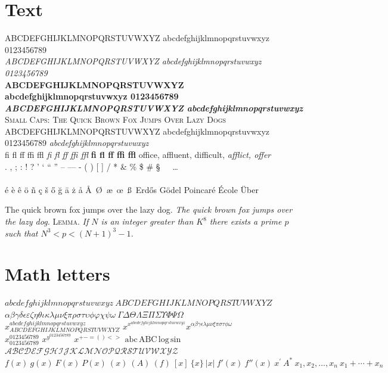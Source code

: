 \section*{Text}
\noindent ABCDEFGHIJKLMNOPQRSTUVWXYZ abcdefghijklmnopqrstuvwxyz 0123456789\\
\textit{ABCDEFGHIJKLMNOPQRSTUVWXYZ abcdefghijklmnopqrstuvwxyz 0123456789}\\
\textbf{ABCDEFGHIJKLMNOPQRSTUVWXYZ abcdefghijklmnopqrstuvwxyz 0123456789}\\
\textbf{\textit{ABCDEFGHIJKLMNOPQRSTUVWXYZ abcdefghijklmnopqrstuvwxyz}}\\
\textsc{Small Caps: The Quick Brown Fox Jumps Over Lazy Dogs}\\
{\small ABCDEFGHIJKLMNOPQRSTUVWXYZ abcdefghijklmnopqrstuvwxyz 0123456789 \textit{abcdefghijklmnopqrstuvwxyz}}\\
fi fl ff ffi ffl \textit{fi fl ff ffi ffl} \textbf{fi fl ff ffi ffl} office, affluent, difficult, \textit{afflict, offer}\\
. , ; : ! ? ' ` `` '' -- --- - ( ) [ ] / * \& \% \$ \# \S\ \dag\ \ddag\ \dots\\
 {\small{}}\\
\'e \`e \^e \"o \~n \c{c} \v{s} \H{o} \u{g} \=a \.z \r{a} \AA\ \O\ \ae\ \oe\ \ss\ Erd\H{o}s G\"odel Poincar\'e \'Ecole \"Uber

The quick brown fox jumps over the lazy dog. \textit{The quick brown fox jumps over the lazy dog.}
\textsc{Lemma.} \textit{If $N$ is an integer greater than $K^8$ there exists a prime $p$ such that $N^3<p<(N+1)^3-1$.}

\section*{Math letters}
$abcdefghijklmnopqrstuvwxyz\ ABCDEFGHIJKLMNOPQRSTUVWXYZ$\\
$\alpha\beta\gamma\delta\epsilon\varepsilon\zeta\eta\theta\iota\kappa\lambda\mu\nu\xi\pi\rho\sigma\tau\upsilon\phi\varphi\chi\psi\omega\ \Gamma\Delta\Theta\Lambda\Xi\Pi\Sigma\Upsilon\Phi\Psi\Omega$\\
$x^{abcdefghijklmnopqrstuvwxyz}_{ABCDEFGHIJKLMNOPQRSTUVWXYZ}$\quad
$x^{x^{abcdefghijklmnopqrstuvwxyz}}$\quad $x^{\alpha\beta\gamma\epsilon\lambda\mu\nu\xi\pi\sigma\tau\phi\omega}$\\
$x^{0123456789}_{0123456789}$ $x^{y^{0123456789}}$ $x^{+-=()<>}$ $\mathrm{abc\,ABC\,log\,sin}$ $\mathcal{ABCDEFGHIJKLMNOPQRSTUVWXYZ}$\\
$f(x)\ g(x)\ F(x)\ P(x)\ (x)\ (A)\ (f)\ [x]\ \{x\}\ |x|\ f'(x)\ f''(x)\ x^{\prime}\ A^*\ x_1, x_2, \dots, x_n\ x_1+\cdots+x_n$

